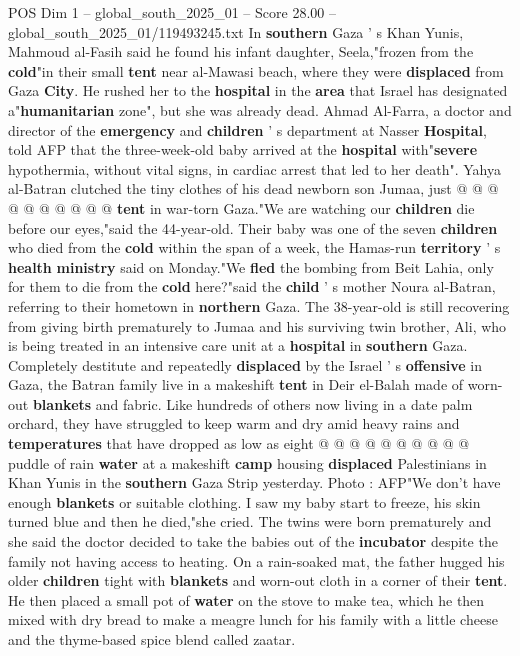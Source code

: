 \begin{textsample}{POS Dim 1 – global\_south\_2025\_01 – Score 28.00 – global\_south\_2025\_01/119493245.txt}
In \textbf{southern} Gaza ' s Khan Yunis, Mahmoud al-Fasih said he found his infant daughter, Seela,"frozen from the \textbf{cold}"in their small \textbf{tent} near al-Mawasi beach, where they were \textbf{displaced} from Gaza \textbf{City}.
He rushed her to the \textbf{hospital} in the \textbf{area} that Israel has designated a"\textbf{humanitarian} zone", but she was already dead.
Ahmad Al-Farra, a doctor and director of the \textbf{emergency} and \textbf{children} ' s department at Nasser \textbf{Hospital}, told AFP that the three-week-old baby arrived at the \textbf{hospital} with"\textbf{severe} hypothermia, without vital signs, in cardiac arrest that led to her death".
Yahya al-Batran clutched the tiny clothes of his dead newborn son Jumaa, just @ @ @ @ @ @ @ @ @ @ \textbf{tent} in war-torn Gaza."We are watching our \textbf{children} die before our eyes,"said the 44-year-old.
Their baby was one of the seven \textbf{children} who died from the \textbf{cold} within the span of a week, the Hamas-run \textbf{territory} ' s \textbf{health} \textbf{ministry} said on Monday."We \textbf{fled} the bombing from Beit Lahia, only for them to die from the \textbf{cold} here?"said the \textbf{child} ' s mother Noura al-Batran, referring to their hometown in \textbf{northern} Gaza.
The 38-year-old is still recovering from giving birth prematurely to Jumaa and his surviving twin brother, Ali, who is being treated in an intensive care unit at a \textbf{hospital} in \textbf{southern} Gaza.
Completely destitute and repeatedly \textbf{displaced} by the Israel ' s \textbf{offensive} in Gaza, the Batran family live in a makeshift \textbf{tent} in Deir el-Balah made of worn-out \textbf{blankets} and fabric.
Like hundreds of others now living in a date palm orchard, they have struggled to keep warm and dry amid heavy rains and \textbf{temperatures} that have dropped as low as eight @ @ @ @ @ @ @ @ @ @ puddle of rain \textbf{water} at a makeshift \textbf{camp} housing \textbf{displaced} Palestinians in Khan Yunis in the \textbf{southern} Gaza Strip yesterday.
Photo : AFP"We don't have enough \textbf{blankets} or suitable clothing.
I saw my baby start to freeze, his skin turned blue and then he died,"she cried.
The twins were born prematurely and she said the doctor decided to take the babies out of the \textbf{incubator} despite the family not having access to heating.
On a rain-soaked mat, the father hugged his older \textbf{children} tight with \textbf{blankets} and worn-out cloth in a corner of their \textbf{tent}.
He then placed a small pot of \textbf{water} on the stove to make tea, which he then mixed with dry bread to make a meagre lunch for his family with a little cheese and the thyme-based spice blend called zaatar.

\end{textsample}
